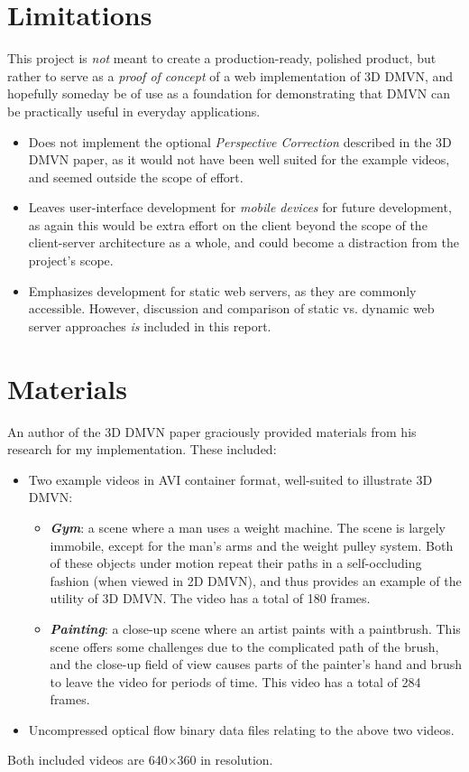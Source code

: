 \section{Limitations}
This project is \emph{not} meant to create a production-ready, polished product, but rather to serve as a \emph{proof of concept} of a web implementation of 3D DMVN, and hopefully someday be of use as a foundation for demonstrating that DMVN can be practically useful in everyday applications.
\begin{itemize}
    \item Does not implement the optional \emph{Perspective Correction} described in the 3D DMVN paper, as it would not have been well suited for the example videos, and seemed outside the scope of effort.
    \item Leaves user-interface development for \emph{mobile devices}\cite{fatfinger} for future development, as again this would be extra effort on the client beyond the scope of the client-server architecture as a whole, and could become a distraction from the project's scope.
    \item Emphasizes development for static web servers, as they are commonly accessible. However, discussion and comparison of static vs. dynamic web server approaches \emph{is} included in this report.
\end{itemize}

\section{Materials}
An author of the 3D DMVN paper graciously provided materials from his research for my implementation. These included:
\begin{itemize}
    \item Two example videos in AVI container format, well-suited to illustrate 3D DMVN:
    \begin{itemize}
    \item \textbf{\emph{Gym}}: a scene where a man uses a weight machine. The scene is largely immobile, except for the man's arms and the weight pulley system. Both of these objects under motion repeat their paths in a self-occluding fashion (when viewed in 2D DMVN), and thus provides an example of the utility of 3D DMVN. The video has a total of 180 frames.
    \item \textbf{\emph{Painting}}: a close-up scene where an artist paints with a paintbrush. This scene offers some challenges due to the complicated path of the brush, and the close-up field of view causes parts of the painter's hand and brush to leave the video for periods of time. This video has a total of 284 frames.
    \end{itemize}
    \item Uncompressed optical flow binary data files relating to the above two videos.
\end{itemize}
Both included videos are 640$\times$360 in resolution.

